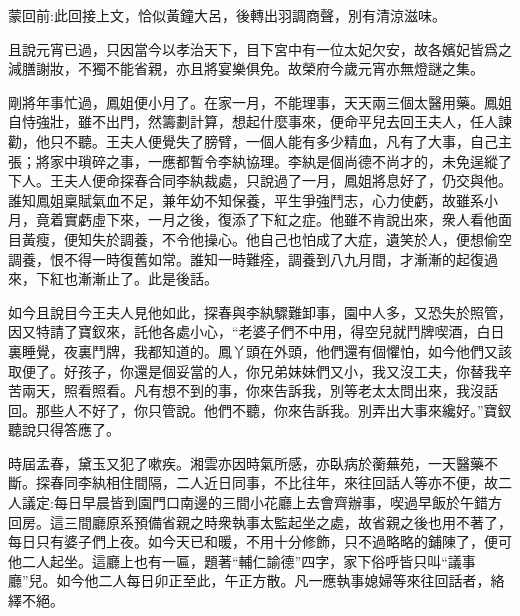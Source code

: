 
\begin{parag}
    \begin{note}蒙回前:此回接上文，恰似黃鐘大呂，後轉出羽調商聲，別有清涼滋味。\end{note}
\end{parag}


\begin{parag}
    且說元宵已過，只因當今以孝治天下，目下宮中有一位太妃欠安，故各嬪妃皆爲之減膳謝妝，不獨不能省親，亦且將宴樂俱免。故榮府今歲元宵亦無燈謎之集。
\end{parag}


\begin{parag}
    剛將年事忙過，鳳姐便小月了。在家一月，不能理事，天天兩三個太醫用藥。鳳姐自恃強壯，雖不出門，然籌劃計算，想起什麼事來，便命平兒去回王夫人，任人諫勸，他只不聽。王夫人便覺失了膀臂，一個人能有多少精血，凡有了大事，自己主張；將家中瑣碎之事，一應都暫令李紈協理。李紈是個尚德不尚才的，未免逞縱了下人。王夫人便命探春合同李紈裁處，只說過了一月，鳳姐將息好了，仍交與他。誰知鳳姐稟賦氣血不足，兼年幼不知保養，平生爭強鬥志，心力使虧，故雖系小月，竟着實虧虛下來，一月之後，復添了下紅之症。他雖不肯說出來，衆人看他面目黃瘦，便知失於調養，不令他操心。他自己也怕成了大症，遺笑於人，便想偷空調養，恨不得一時復舊如常。誰知一時難痊，調養到八九月間，才漸漸的起復過來，下紅也漸漸止了。此是後話。
\end{parag}


\begin{parag}
    如今且說目今王夫人見他如此，探春與李紈驟難卸事，園中人多，又恐失於照管，因又特請了寶釵來，託他各處小心，“老婆子們不中用，得空兒就鬥牌喫酒，白日裏睡覺，夜裏鬥牌，我都知道的。鳳丫頭在外頭，他們還有個懼怕，如今他們又該取便了。好孩子，你還是個妥當的人，你兄弟妹妹們又小，我又沒工夫，你替我辛苦兩天，照看照看。凡有想不到的事，你來告訴我，別等老太太問出來，我沒話回。那些人不好了，你只管說。他們不聽，你來告訴我。別弄出大事來纔好。”寶釵聽說只得答應了。
\end{parag}


\begin{parag}
    時屆孟春，黛玉又犯了嗽疾。湘雲亦因時氣所感，亦臥病於蘅蕪苑，一天醫藥不斷。探春同李紈相住間隔，二人近日同事，不比往年，來往回話人等亦不便，故二人議定:每日早晨皆到園門口南邊的三間小花廳上去會齊辦事，喫過早飯於午錯方回房。這三間廳原系預備省親之時衆執事太監起坐之處，故省親之後也用不著了，每日只有婆子們上夜。如今天已和暖，不用十分修飾，只不過略略的鋪陳了，便可他二人起坐。這廳上也有一匾，題著“輔仁諭德”四字，家下俗呼皆只叫“議事廳”兒。如今他二人每日卯正至此，午正方散。凡一應執事媳婦等來往回話者，絡繹不絕。
\end{parag}


